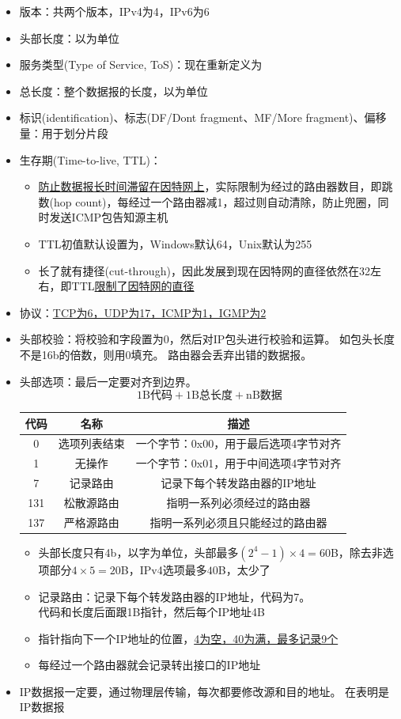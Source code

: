 \begin{itemize}
\item 版本：共两个版本，IPv4为4，IPv6为6
\item 头部长度：以为单位
\item 服务类型(Type of Service, ToS)：现在重新定义为
\item 总长度：整个数据报的长度，以为单位
\item 标识(identification)、标志(DF/Dont fragment、MF/More fragment)、偏移量：用于划分片段
\item 生存期(Time-to-live, TTL)：
\begin{itemize}
	\item \underline{防止数据报长时间滞留在因特网上}，实际限制为经过的路由器数目，即跳数(hop count)，每经过一个路由器减1，超过则自动清除，防止兜圈，同时发送ICMP包告知源主机
	\item TTL初值默认设置为，Windows默认64，Unix默认为255
	\item 长了就有捷径(cut-through)，因此发展到现在因特网的直径依然在32左右，即TTL\underline{限制了因特网的直径}
\end{itemize}
\item 协议：\underline{TCP为6，UDP为17，ICMP为1，IGMP为2}
\item 头部校验：将校验和字段置为0，然后对IP包头进行校验和运算。
如包头长度不是16b的倍数，则用0填充。
路由器会丢弃出错的数据报。
\item 头部选项：最后一定要对齐到边界。
\[\text{1B代码} + \text{1B总长度} + \text{nB数据}\]
\begin{center}
\begin{tabular}{|c|c|c|}\hline
代码 & 名称 & 描述\\\hline
0 & 选项列表结束 & 一个字节：0x00，用于最后选项4字节对齐\\\hline
1 & 无操作 & 一个字节：0x01，用于中间选项4字节对齐\\\hline
7 & 记录路由 & 记录下每个转发路由器的IP地址\\\hline
131 & 松散源路由 & 指明一系列必须经过的路由器\\\hline
137 & 严格源路由 & 指明一系列必须且只能经过的路由器\\\hline
\end{tabular}
\end{center}
\begin{itemize}
	\item 头部长度只有4b，以字为单位，头部最多$(2^4-1)\times 4=60$B，除去非选项部分$4\times 5=20$B，IPv4选项最多$40$B，太少了
	\item 记录路由：记录下每个转发路由器的IP地址，代码为7。\\
	代码和长度后面跟1B指针，然后每个IP地址4B
	\item 指针指向下一个IP地址的位置，\underline{4为空，40为满，最多记录9个}
	\item 每经过一个路由器就会记录转出接口的IP地址
\end{itemize}
\item IP数据报一定要，通过物理层传输，每次都要修改源和目的地址。
在表明是IP数据报
\end{itemize}

